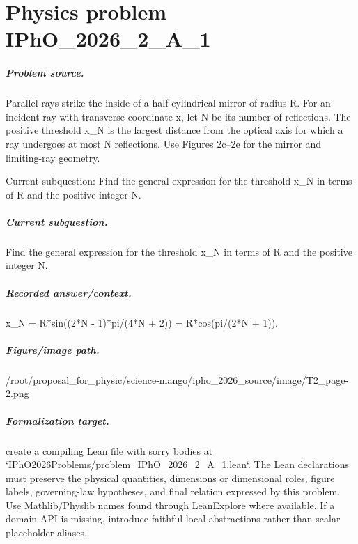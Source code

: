
\chapter{Physics problem IPhO\_2026\_2\_A\_1}
\label{ch:IPhO2026Problems_problem_IPhO_2026_2_A_1}

\paragraph{Problem source.}
Parallel rays strike the inside of a half-cylindrical mirror of radius R.  For
an incident ray with transverse coordinate x, let N be its number of
reflections.  The positive threshold x\_N is the largest distance from the
optical axis for which a ray undergoes at most N reflections.  Use Figures
2c--2e for the mirror and limiting-ray geometry.

Current subquestion:
Find the general expression for the threshold x\_N in terms of R and the positive integer N.

\paragraph{Current subquestion.}
Find the general expression for the threshold x\_N in terms of R and the positive integer N.

\paragraph{Recorded answer/context.}
x\_N = R*sin((2*N - 1)*pi/(4*N + 2)) = R*cos(pi/(2*N + 1)).

\paragraph{Figure/image path.}
/root/proposal\_for\_physic/science-mango/ipho\_2026\_source/image/T2\_page-2.png

\paragraph{Formalization target.}
create a compiling Lean file with sorry bodies at `IPhO2026Problems/problem\_IPhO\_2026\_2\_A\_1.lean`.
The Lean declarations must preserve the physical quantities, dimensions or dimensional roles, figure labels, governing-law hypotheses, and final relation expressed by this problem.
Use Mathlib/Physlib names found through LeanExplore where available. If a domain API is missing, introduce faithful local abstractions rather than scalar placeholder aliases.

